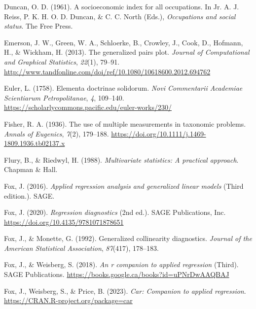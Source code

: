 \documentclass[
  letterpaper,
  10pt,
  krantz2]{krantz}
\newlength{\cslhangindent}
\newlength{\cslentryspacingunit} %
\newenvironment{CSLReferences}[2] %
 {%
  \setlength{\parindent}{0pt}
  \ifodd #1
  \let\oldpar\par
  \def\par{\hangindent=\cslhangindent\oldpar}
  \fi
  \setlength{\parskip}{#2\cslentryspacingunit}
 }%
 {}
\begin{document}
\begin{CSLReferences}{1}{0}
\leavevmode{}%
Duncan, O. D. (1961). A socioeconomic index for all occupations. In Jr.
A. J. Reiss, P. K. H. O. D. Duncan, \& C. C. North (Eds.),
\emph{Occupations and social status}. The Free Press.

\leavevmode{}%
Emerson, J. W., Green, W. A., Schloerke, B., Crowley, J., Cook, D.,
Hofmann, H., \& Wickham, H. (2013). The generalized pairs plot.
\emph{Journal of Computational and Graphical Statistics}, \emph{22}(1),
79--91.
\url{http://www.tandfonline.com/doi/ref/10.1080/10618600.2012.694762}

\leavevmode{}%
Euler, L. (1758). Elementa doctrinae solidorum. \emph{Novi Commentarii
Academiae Scientiarum Petropolitanae}, \emph{4}, 109--140.
\url{https://scholarlycommons.pacific.edu/euler-works/230/}

\leavevmode{}%
Fisher, R. A. (1936). The use of multiple measurements in taxonomic
problems. \emph{Annals of Eugenics}, \emph{7}(2), 179--188.
\url{https://doi.org/10.1111/j.1469-1809.1936.tb02137.x}

\leavevmode{}%
Flury, B., \& Riedwyl, H. (1988). \emph{Multivariate statistics: A
practical approach}. Chapman \& Hall.

\leavevmode{}%
Fox, J. (2016). \emph{Applied regression analysis and generalized linear
models} (Third edition.). SAGE.

\leavevmode{}%
Fox, J. (2020). \emph{Regression diagnostics} (2nd ed.). {SAGE}
Publications, Inc. \url{https://doi.org/10.4135/9781071878651}

\leavevmode{}%
Fox, J., \& Monette, G. (1992). Generalized collinearity diagnostics.
\emph{Journal of the American Statistical Association}, \emph{87}(417),
178--183.

\leavevmode{}%
Fox, J., \& Weisberg, S. (2018). \emph{An r companion to applied
regression} (Third). SAGE Publications.
\url{https://books.google.ca/books?id=uPNrDwAAQBAJ}

\leavevmode{}%
Fox, J., Weisberg, S., \& Price, B. (2023). \emph{Car: Companion to
applied regression}. \url{https://CRAN.R-project.org/package=car}


\end{CSLReferences}
\end{document}

